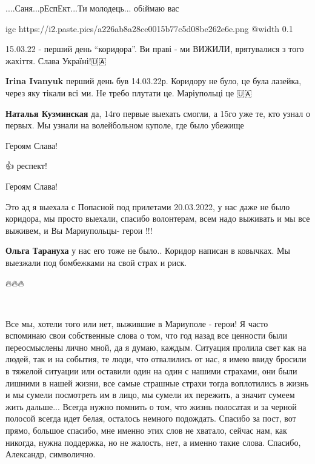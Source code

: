 ....Саня...рЕспЕкт...Ти молодець... обiймаю вас

\ifcmt
  igc https://i2.paste.pics/a226ab8a28ce0015b77c5d08be262e6e.png
	@width 0.1
\fi


15.03.22 - перший день \enquote{коридора}. Ви праві - ми ВИЖИЛИ, врятувалися з того жахіття. Слава Україні!🇺🇦

\begin{itemize} %
\textbf{Irina Ivanyuk} перший день був 14.03.22р. Коридору не було, це була лазейка, через яку тікали всі ми. Не требо плутати це. Маріупольці це 🇺🇦

\textbf{Наталья Кузминская} да, 14го первые выехать смогли, а 15го уже те, кто узнал о первых. Мы узнали на волейбольном куполе, где было убежище
\end{itemize} %


Героям Слава!


👍 респект!


Героям Слава!


Это ад я выехала с Попасной под прилетами 20.03.2022, у нас даже не было
коридора, мы просто выехали, спасибо волонтерам, всем надо выживать и мы все
выживем, и Вы Мариупольцы- герои !!!

\begin{itemize} %
\textbf{Ольга Тарануха} у нас его тоже не было.. Коридор написан в ковычках. Мы выезжали под бомбежками на свой страх и риск.
\end{itemize} %


🔥🔥🔥


💙💛🙏


Все мы, хотели того или нет, выжившие в Мариуполе - герои! Я часто вспоминаю
свои собственные слова о том, что год назад все ценности были переосмыслены
лично мной, да я думаю, каждым. Ситуация пролила свет как на людей, так и на
события, те люди, что отвалились от нас, я имею ввиду бросили в тяжелой
ситуации или оставили один на один с нашими страхами, они были лишними в нашей
жизни, все самые страшные страхи тогда воплотились в жизнь и мы сумели
посмотреть им в лицо, мы сумели их пережить, а значит сумеем жить дальше...
Всегда нужно помнить о том, что жизнь полосатая и за черной полосой всегда идет
белая, осталось немного подождать. Спасибо за пост, вот прямо, большое спасибо,
мне именно этих слов не хватало, сейчас нам, как никогда, нужна поддержка, но
не жалость, нет, а именно такие слова. Спасибо, Александр, символично.

